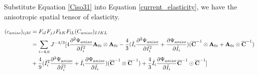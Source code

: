 Substitute Equation \ref{Ciso31} into Equation \ref{current_elasticity}, we have the anisotropic spatial tensor of elasticity.

\begin{equation} \label{spatial_ciso3}
\begin{split}
(c_{aniso})_{ijkl} &=  F_{iI}F_{jJ}F_{kK}F_{lL}(C_{aniso})_{IJKL} \\
&= 
 \sum_{i = 4, 6} J^{-4/3}[4\frac{\partial^2\Psi_{aniso}}{\partial{\bar{I}_i}^2} \bold{A}_{0i} \otimes \bold{A}_{0i} - \frac{4}{3}(\bar{I}_i\frac{\partial^2\Psi_{aniso}}{\partial{\bar{I}_i}^2} + \frac{\partial\Psi_{aniso}}{\partial{\bar{I}_i}})(\overline{\bold{C}}^{-1} \otimes \bold{A}_{0i} + \bold{A}_{0i} \otimes \overline{\bold{C}}^{-1}) \\
&+ \frac{4}{9}({\bar{I}_i}^2\frac{\partial^2\Psi_{aniso}}{\partial{\bar{I}_i}^2} + \bar{I}_i\frac{\partial\Psi_{aniso}}{\partial{\bar{I}_i}})(\overline{\bold{C}}^{-1} \otimes \overline{\bold{C}}^{-1}) 
+ \frac{4}{3}\bar{I}_i \frac{\partial\Psi_{aniso}}{\partial{\bar{I}_i}} \overline{\bold{C}}^{-1} \odot \overline{\bold{C}}^{-1}]
\end{split}
\end{equation} 



